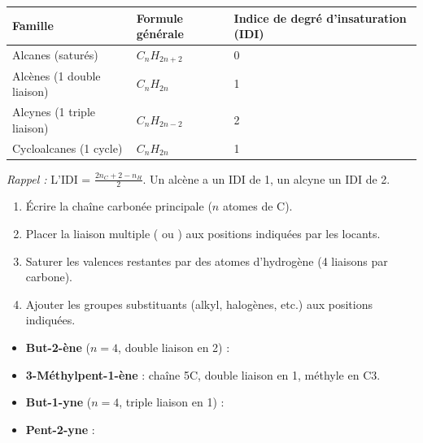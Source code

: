 \documentclass[11pt]{article}
\begin{document}
\begin{propriete}
\begin{center}
\begin{tabularx}{\linewidth}{|l|X|X|}
\hline
\rowcolor{popblueL} \textbf{Famille} & \textbf{Formule générale} & \textbf{Indice de degré d'insaturation (IDI)} \\
\hline
Alcanes (saturés) & $C_nH_{2n+2}$ & 0 \\
\hline
Alcènes (1 double liaison) & $C_nH_{2n}$ & 1 \\
\hline
Alcynes (1 triple liaison) & $C_nH_{2n-2}$ & 2 \\
\hline
Cycloalcanes (1 cycle) & $C_nH_{2n}$ & 1 \\
\hline
\end{tabularx}
\end{center}
\emph{Rappel :} L'IDI = $\frac{2n_C + 2 - n_H}{2}$. Un alcène a un IDI de 1, un alcyne un IDI de 2.
\end{propriete}

\begin{methode}
\begin{enumerate}
  \item Écrire la chaîne carbonée principale ($n$ atomes de C).
  \item Placer la liaison multiple ( ou ) aux positions indiquées par les locants.
  \item Saturer les valences restantes par des atomes d'hydrogène (4 liaisons par carbone).
  \item Ajouter les groupes substituants (alkyl, halogènes, etc.) aux positions indiquées.
\end{enumerate}
\end{methode}

\begin{exemplebox}
\begin{itemize}
  \item \textbf{But-2-ène} ($n=4$, double liaison en 2) : 
  \item \textbf{3-Méthylpent-1-ène} : chaîne 5C, double liaison en 1, méthyle en C3.
  \item \textbf{But-1-yne} ($n=4$, triple liaison en 1) : 
  \item \textbf{Pent-2-yne} : 
\end{itemize}
\end{exemplebox}
\end{document}
